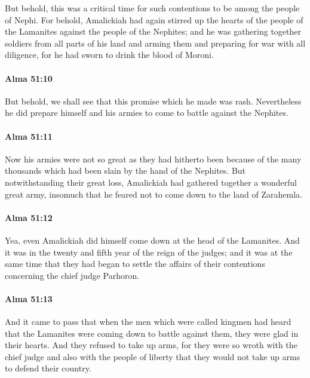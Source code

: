 			But behold, this was a critical time
			for such contentions to be among the people of Nephi.
			For behold, Amalickiah had again stirred up
			the hearts of the people of the Lamanites against the people of the Nephites;
			and he was gathering together soldiers from all parts of his land
			and arming them and preparing for war with all diligence,
			for he had sworn to drink the blood of Moroni.

		\paragraph{Alma 51:10} %
			\label{ALMA-51-10}

			But behold, we shall see that this promise which he made was rash.
			Nevertheless he did prepare himself and his armies
			to come to battle against the Nephites.

		\paragraph{Alma 51:11} %
			\label{ALMA-51-11}

			Now his armies were not so great as they had hitherto been
			because of the many thousands which had been slain by the hand of the Nephites.
			But notwithstanding their great loss,
			Amalickiah had gathered together a wonderful great army,
			insomuch that he feared not to come down to the land of Zarahemla.

		\paragraph{Alma 51:12} %
			\label{ALMA-51-12}

			Yea, even Amalickiah did himself come down at the head of the Lamanites.
			And it was in the twenty and fifth year of the reign of the judges;
			and it was at the same time that they had began
			to settle the affairs of their contentions concerning the chief judge Parhoron.

		\paragraph{Alma 51:13} %
			\label{ALMA-51-13}

			And it came to pass that
			when the men which were called kingmen had heard
			that the Lamanites were coming down to battle against them,
			they were glad in their hearts.
			And they refused to take up arms,
			for they were so wroth with the chief judge
			and also with the people of liberty
			that they would not take up arms to defend their country.

